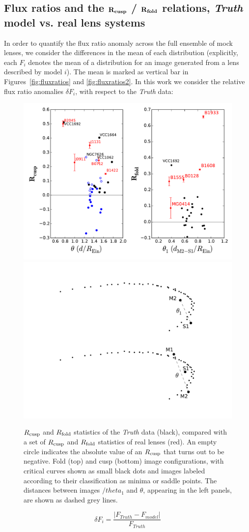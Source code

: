 \subsection{Flux ratios and the $\bf{R_{cusp}}$ / $\bf{R_{fold}}$ relations, \textit{Truth} model vs. real lens systems}
In order to quantify the flux ratio anomaly across the full ensemble
of mock lenses, we consider the differences in the mean of each
distribution (explicitly, each $F_{i}$ denotes the mean of a
distribution for an image generated from a lens described by model
$i$). The mean is marked as vertical bar in
Figures~\ref{fig:fluxratios} and \ref{fig:fluxratios2}. In this work we consider the relative flux ratio anomalies $\delta F_i$, with respect to the \textit{Truth} data:
\begin{figure}
	\includegraphics[trim=0cm 0cm 0cm 0cm,clip,width=.75\textwidth]{./figures_sls/dmax_vs_Rcuspfold-eps-converted-to.pdf}
	\includegraphics[trim=12cm 1cm 0cm 0.5cm,clip,width=.3\textwidth]{./figures_sls/fold_theta1.pdf}
	\caption{\label{fig:Rcuspfold_vs_real}$R_{\rm{cusp}}$ and $R_{\rm{fold}}$ statistics of the \textit{Truth} data (black), compared with a set of $R_{\rm{cusp}}$ and $R_{\rm{fold}}$ statistics of real lenses (red). An empty circle indicates the absolute value of an $R_{\rm{cusp}}$ that turns out to be negative. Fold (top) and cusp (bottom) image configurations,  with critical curves shown as small black dots and images labeled according to their classification as minima or saddle points. The distances between images $/theta_1$ and $\theta$, appearing in the left panels, are shown as dashed grey lines.}
\end{figure}
\begin{equation}
\nonumber \delta F_i = \frac{| F_{Truth} - F_{model} |}{F_{Truth}}
\end{equation}

